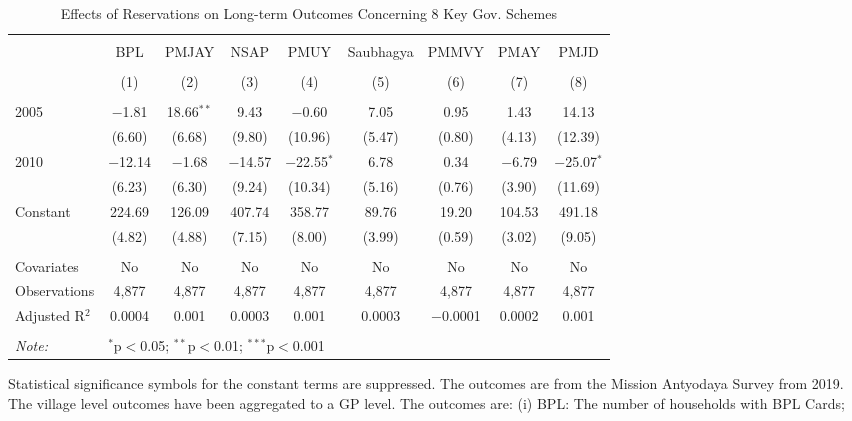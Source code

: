 \begin{table}[!htbp]
\centering
\begin{threeparttable}

  \caption{Effects of Reservations on Long-term Outcomes Concerning 8 Key Gov. Schemes} 
  \label{raj_shrug_schemes_05_10} 
\scriptsize 
\begin{tabular}{@{\extracolsep{0pt}}lcccccccc} 
\\[-1.8ex]\hline 
\hline \\[-1.8ex] 
 & BPL & PMJAY & NSAP & PMUY & Saubhagya & PMMVY & PMAY & PMJD \\ 
\\[-1.8ex] & (1) & (2) & (3) & (4) & (5) & (6) & (7) & (8)\\ 
\hline \\[-1.8ex] 
 2005 & $-$1.81 & 18.66$^{**}$ & 9.43 & $-$0.60 & 7.05 & 0.95 & 1.43 & 14.13 \\ 
  & (6.60) & (6.68) & (9.80) & (10.96) & (5.47) & (0.80) & (4.13) & (12.39) \\ 
  2010 & $-$12.14 & $-$1.68 & $-$14.57 & $-$22.55$^{*}$ & 6.78 & 0.34 & $-$6.79 & $-$25.07$^{*}$ \\ 
  & (6.23) & (6.30) & (9.24) & (10.34) & (5.16) & (0.76) & (3.90) & (11.69) \\ 
  Constant & 224.69 & 126.09 & 407.74 & 358.77 & 89.76 & 19.20 & 104.53 & 491.18 \\ 
  & (4.82) & (4.88) & (7.15) & (8.00) & (3.99) & (0.59) & (3.02) & (9.05) \\ 
 \hline \\[-1.8ex] 
Covariates & No & No & No & No & No & No & No & No \\ 
Observations & 4,877 & 4,877 & 4,877 & 4,877 & 4,877 & 4,877 & 4,877 & 4,877 \\ 
Adjusted R$^{2}$ & 0.0004 & 0.001 & 0.0003 & 0.001 & 0.0003 & $-$0.0001 & 0.0002 & 0.001 \\ 
\hline 
\hline \\[-1.8ex] 
\textit{Note:}  & \multicolumn{8}{l}{$^{*}$p$<$0.05; $^{**}$p$<$0.01; $^{***}$p$<$0.001} \\ 
\end{tabular} 
\begin{tablenotes}[flushleft]
\scriptsize
\item[] Statistical significance symbols for the constant terms are suppressed. The outcomes are from the Mission Antyodaya Survey from 2019.
                   The village level outcomes have been aggregated to a GP level. The outcomes are:
                   (i) BPL: The number of households with BPL Cards;

\end{tablenotes}
\end{threeparttable}
\end{table}
